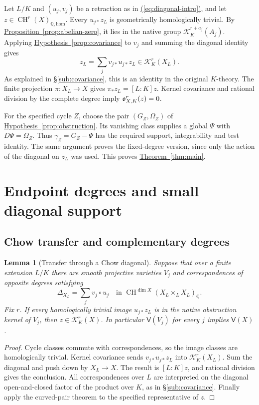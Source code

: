 \documentclass[11pt,a4paper]{article}
\newtheorem{lemma}[theorem]{Lemma}
\theoremstyle{definition}
\theoremstyle{remark}\newtheorem{remark}[theorem]{Remark}
\numberwithin{equation}{section}
\newcommand{\Q}{\mathbb Q}\newcommand{\R}{\mathbb R}\newcommand{\C}{\mathbb C}
\newcommand{\CH}{\operatorname{CH}}\newcommand{\an}{\mathrm{an}}
\newcommand{\homol}{\mathrm{hom}}\newcommand{\BC}{\mathrm{BC}}
\newcommand{\cK}{\mathcal K}\newcommand{\cH}{\mathcal H}
\newcommand{\subref}[1]{\hyperref[#1]{\textcolor{sectionlink}{\S\ref*{#1}}}}
\newcommand{\thmref}[1]{\hyperref[#1]{\textcolor{resultlink}{Theorem~\ref*{#1}}}}
\newcommand{\propref}[1]{\hyperref[#1]{\textcolor{resultlink}{Proposition~\ref*{#1}}}}
\newcommand{\hypref}[1]{\hyperref[#1]{\textcolor{resultlink}{Hypothesis~\ref*{#1}}}}
\renewcommand{\eqref}[1]{\hyperref[#1]{\textcolor{equationlink}{(\ref*{#1})}}}
\begin{document}
Let $L/K$ and $(u_j,v_j)$ be a retraction as in
\eqref{eq:diagonal-intro}, and let $z\in\CH^r(X)_{\Q,\homol}$.
Every $u_{j*}z_L$ is geometrically homologically trivial.
By \propref{prop:abelian-zero}, it lies in the native group
$\mathcal K_K^{r+a_j}(A_j)$. Applying \hypref{prop:covariance} to
$v_j$ and summing the diagonal identity gives
\[
               z_L=\sum_jv_{j*}u_{j*}z_L\in\mathcal K_K^r(X_L).
\]
As explained in \subref{sub:covariance}, this is an identity in the
original $K$-theory. The finite projection $\pi:X_L\to X$ gives
$\pi_*z_L=[L:K]z$. Kernel covariance and rational division by the
complete degree imply $\mathfrak o^r_{X,K}(z)=0$.

For the specified cycle $Z$, choose the pair $(G_Z,\Omega_Z)$ of
\hypref{prop:obstruction}. Its vanishing class supplies a global
$\Psi$ with $D\Psi=\Omega_Z$. Thus $\gamma_Z=G_Z-\Psi$ has
the required support, integrability and test identity. The same
argument proves the fixed-degree version, since only the action
of the diagonal on $z_L$ was used. This proves \thmref{thm:main}.


\section{Endpoint degrees and small diagonal support}\label{sec:endpoints}

\subsection{Chow transfer and complementary degrees}

\begin{lemma}[Transfer through a Chow diagonal]\label{lem:general-transfer}
Suppose that over a finite extension $L/K$ there are smooth projective
varieties $V_j$ and correspondences of opposite degrees satisfying
\[
 \Delta_{X_L}=\sum_jv_j\circ u_j
 \quad\text{in }\CH^{\dim X}(X_L\times_LX_L)_\Q.
\]
Fix $r$. If every homologically trivial image $u_{j*}z_L$ is in the
native obstruction kernel of $V_j$, then
$z\in\cK_K^r(X)$. In particular $\mathsf V(V_j)$ for every $j$
implies $\mathsf V(X)$.
\end{lemma}

\begin{proof}
Cycle classes commute with correspondences, so the image classes are
homologically trivial. Kernel covariance sends $v_{j*}u_{j*}z_L$ into
$\cK_K^r(X_L)$. Sum the diagonal and push down by $X_L\to X$.
The result is $[L:K]z$, and rational division gives the conclusion.
All correspondences over $L$ are interpreted on the diagonal
open-and-closed factor of the product over $K$, as in
\subref{sub:covariance}. Finally apply the curved-pair theorem to the
specified representative of $z$.
\end{proof}
\end{document}
